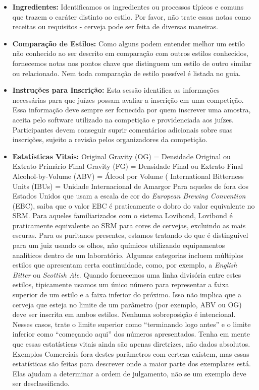 \begin{itemize}
\item \textbf{Ingredientes:} Identificamos os ingredientes ou processos típicos e comuns que trazem o caráter distinto ao estilo. Por favor, não trate essas notas como receitas ou requisitos - cerveja pode ser feita de diversas maneiras.
\item \textbf{Comparação de Estilos:} Como alguns podem entender melhor um estilo não conhecido ao ser descrito em comparação com outros estilos conhecidos, fornecemos notas nos pontos chave que distinguem um estilo de outro similar ou relacionado. Nem toda comparação de estilo possível é listada no guia.
\item \textbf{Instruções para Inscrição:} Esta sessão identifica as informações necessárias para que juízes possam avaliar a inscrição em uma competição. Essa informação deve sempre ser fornecida por quem inscrever uma amostra, aceita pelo software utilizado na competição e providenciada aos juízes. Participantes devem conseguir suprir comentários adicionais sobre suas inscrições, sujeito a revisão pelos organizadores da competição.
\item \textbf{Estatísticas Vitais:}
Original Gravity (OG) = Densidade Original ou Extrato Primário
Final Gravity (FG) = Densidade Final ou Extrato Final
Alcohol-by-Volume (ABV) = Álcool por Volume (%
International Bitterness Units (IBUs) = Unidade Internacional de Amargor
Para aqueles de fora dos Estados Unidos que usam a escala de cor do \textit{European Brewing Convention} (EBC), saiba que o valor EBC é praticamente o dobro do valor equivalente no SRM. Para aqueles familiarizados com o sistema Lovibond, Lovibond é praticamente equivalente ao SRM para cores de cervejas, excluindo as mais escuras. Para os puritanos presentes, estamos tratando do que é distinguível para um juiz usando os olhos, não químicos utilizando equipamentos analíticos dentro de um laboratório.
Algumas categorias incluem múltiplos estilos que apresentam certa continuidade, como, por exemplo, a \textit{English Bitter} ou \textit{Scottish Ale}. Quando fornecemos uma linha divisória entre estes estilos, tipicamente usamos um único número para representar a faixa superior de um estilo e a faixa inferior do próximo. Isso não implica que a cerveja que esteja no limite de um parâmetro (por exemplo, ABV ou OG) deve ser inscrita em ambos estilos. Nenhuma sobreposição é intencional. Nesses casos, trate o limite superior como “terminando logo antes” e o limite inferior como “começando aqui” dos números apresentados.
Tenha em mente que essas estatísticas vitais ainda são apenas diretrizes, não dados absolutos. Exemplos Comerciais fora destes parâmetros com certeza existem, mas essas estatísticas são feitas para descrever onde a maior parte dos exemplares está. Elas ajudam a determinar a ordem de julgamento, não se um exemplo deve ser desclassificado.

\end{itemize}
